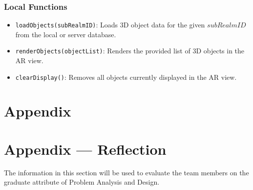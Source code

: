 \documentclass[12pt, titlepage]{article}
\begin{document}
\subsubsection{Local Functions}

\begin{itemize}
  \item \texttt{loadObjects(subRealmID)}: Loads 3D object data for the given \( subRealmID \) from the local or server database.
  \item \texttt{renderObjects(objectList)}: Renders the provided list of 3D objects in the AR view.
  \item \texttt{clearDisplay()}: Removes all objects currently displayed in the AR view.
\end{itemize}

\newpage



\section{Appendix} \label{Appendix}


\newpage{}

\section*{Appendix --- Reflection}


The information in this section will be used to evaluate the team members on the
graduate attribute of Problem Analysis and Design.


\end{document}
